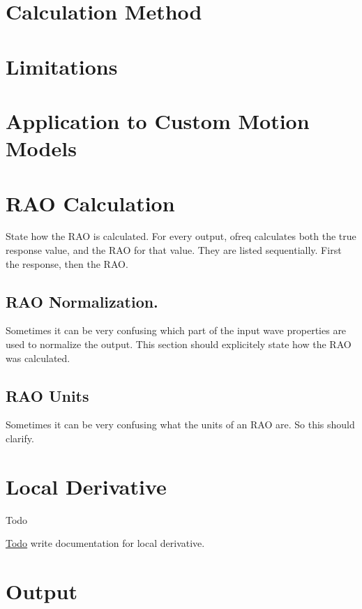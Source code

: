 \section*{Calculation Method}

\section*{Limitations}

\section*{Application to Custom Motion Models}

\section*{R\-A\-O Calculation}

State how the R\-A\-O is calculated. For every output, ofreq calculates both the true response value, and the R\-A\-O for that value. They are listed sequentially. First the response, then the R\-A\-O.

\subsection*{R\-A\-O Normalization.}

Sometimes it can be very confusing which part of the input wave properties are used to normalize the output. This section should explicitely state how the R\-A\-O was calculated.

\subsection*{R\-A\-O Units}

Sometimes it can be very confusing what the units of an R\-A\-O are. So this should clarify. \hypertarget{local_derivative}{}\section{Local Derivative}\label{local_derivative}
\begin{DoxyRefDesc}{Todo}
\item[\hyperlink{todo__todo000024}{Todo}]write documentation for local derivative.\end{DoxyRefDesc}


\section*{Output}

